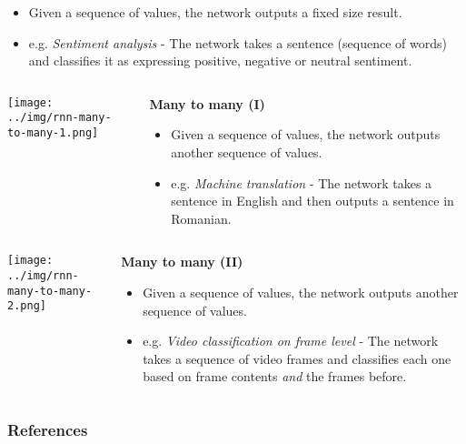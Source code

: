 \documentclass{beamer}
\begin{document}
\begin{frame}[allowframebreaks]
\begin{columns}
\begin{column}{0.7\textwidth}
      \begin{itemize}
        \item Given a sequence of values, the network outputs a fixed size result.
        \item e.g. \textit{Sentiment analysis} - The network takes a sentence (sequence of words) and classifies it as expressing positive, negative or neutral sentiment.
      \end{itemize}
    \end{column}
  \end{columns}
  \framebreak
  \begin{columns}
    \begin{column}{0.5\textwidth}
      \texttt{[image: ../img/rnn-many-to-many-1.png]}
    \end{column}
    \begin{column}{0.5\textwidth}
      \begin{center}
        \textbf{Many to many (I)}
      \end{center}
      \begin{itemize}
        \item Given a sequence of values, the network outputs another sequence of values.
        \item e.g. \textit{Machine translation} - The network takes a sentence in English and then outputs a sentence in Romanian.
      \end{itemize}
    \end{column}
  \end{columns}
  \framebreak
  \begin{columns}
    \begin{column}{0.3\textwidth}
      \texttt{[image: ../img/rnn-many-to-many-2.png]}
    \end{column}
    \begin{column}{0.7\textwidth}
      \begin{center}
        \textbf{Many to many (II)}
      \end{center}
      \begin{itemize}
        \item Given a sequence of values, the network outputs another sequence of values.
        \item e.g. \textit{Video classification on frame level} - The network takes a sequence of video frames and classifies each one based on frame contents \textit{and} the frames before.
      \end{itemize}
    \end{column}
  \end{columns}
\end{frame}
\begin{frame}[allowframebreaks]
  \frametitle{References}
  
  
\end{frame}
\end{document}

